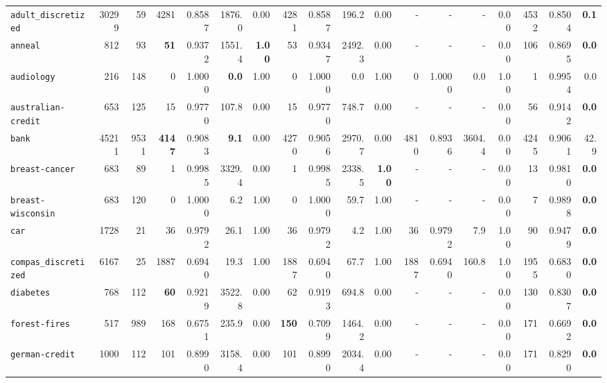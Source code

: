 \begin{tabular}{lccrrrrrrrrrrrrrrr}
\texttt{adult\_discretized} & \multicolumn{1}{r}{30299} & \multicolumn{1}{r}{59}  & 4281 & 0.8587 & 1876.0 & 0.00 & 4281 & 0.8587 & 196.2 & 0.00 & - & - & - & 0.00 & 4532 & 0.8504 & \textbf{0.1}\\
\texttt{anneal} & \multicolumn{1}{r}{812} & \multicolumn{1}{r}{93}  & \textbf{51} & 0.9372 & 1551.4 & \textbf{1.00} & 53 & 0.9347 & 2492.3 & 0.00 & - & - & - & 0.00 & 106 & 0.8695 & \textbf{0.0}\\
\texttt{audiology} & \multicolumn{1}{r}{216} & \multicolumn{1}{r}{148}  & 0 & 1.0000 & \textbf{0.0} & 1.00 & 0 & 1.0000 & 0.0 & 1.00 & 0 & 1.0000 & 0.0 & 1.00 & 1 & 0.9954 & 0.0\\
\texttt{australian-credit} & \multicolumn{1}{r}{653} & \multicolumn{1}{r}{125}  & 15 & 0.9770 & 107.8 & 0.00 & 15 & 0.9770 & 748.7 & 0.00 & - & - & - & 0.00 & 56 & 0.9142 & \textbf{0.0}\\
\texttt{bank} & \multicolumn{1}{r}{45211} & \multicolumn{1}{r}{9531}  & \textbf{4147} & 0.9083 & \textbf{9.1} & 0.00 & 4270 & 0.9056 & 2970.7 & 0.00 & 4810 & 0.8936 & 3604.4 & 0.00 & 4245 & 0.9061 & 42.9\\
\texttt{breast-cancer} & \multicolumn{1}{r}{683} & \multicolumn{1}{r}{89}  & 1 & 0.9985 & 3329.4 & 0.00 & 1 & 0.9985 & 2338.5 & \textbf{1.00} & - & - & - & 0.00 & 13 & 0.9810 & \textbf{0.0}\\
\texttt{breast-wisconsin} & \multicolumn{1}{r}{683} & \multicolumn{1}{r}{120}  & 0 & 1.0000 & 6.2 & 1.00 & 0 & 1.0000 & 59.7 & 1.00 & - & - & - & 0.00 & 7 & 0.9898 & \textbf{0.0}\\
\texttt{car} & \multicolumn{1}{r}{1728} & \multicolumn{1}{r}{21}  & 36 & 0.9792 & 26.1 & 1.00 & 36 & 0.9792 & 4.2 & 1.00 & 36 & 0.9792 & 7.9 & 1.00 & 90 & 0.9479 & \textbf{0.0}\\
\texttt{compas\_discretized} & \multicolumn{1}{r}{6167} & \multicolumn{1}{r}{25}  & 1887 & 0.6940 & 19.3 & 1.00 & 1887 & 0.6940 & 67.7 & 1.00 & 1887 & 0.6940 & 160.8 & 1.00 & 1955 & 0.6830 & \textbf{0.0}\\
\texttt{diabetes} & \multicolumn{1}{r}{768} & \multicolumn{1}{r}{112}  & \textbf{60} & 0.9219 & 3522.8 & 0.00 & 62 & 0.9193 & 694.8 & 0.00 & - & - & - & 0.00 & 130 & 0.8307 & \textbf{0.0}\\
\texttt{forest-fires} & \multicolumn{1}{r}{517} & \multicolumn{1}{r}{989}  & 168 & 0.6751 & 235.9 & 0.00 & \textbf{150} & 0.7099 & 1464.2 & 0.00 & - & - & - & 0.00 & 171 & 0.6692 & \textbf{0.0}\\
\texttt{german-credit} & \multicolumn{1}{r}{1000} & \multicolumn{1}{r}{112}  & 101 & 0.8990 & 3158.4 & 0.00 & 101 & 0.8990 & 2034.4 & 0.00 & - & - & - & 0.00 & 171 & 0.8290 & \textbf{0.0}\\

\end{tabular}
